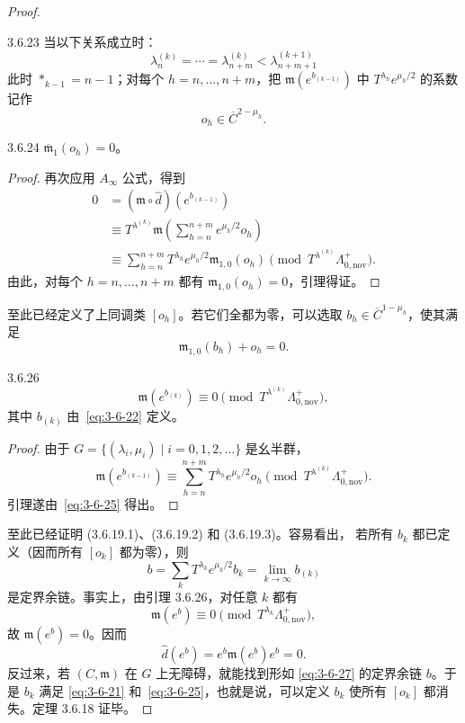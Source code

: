 \begin{proof}
\begin{definition}{3.6.23}\label{def:3-6-23}
当以下关系成立时：
\[
  \lambda_n^{(k)}=\cdots=\lambda_{n+m}^{(k)}
  <\lambda_{n+m+1}^{(k+1)}
\]
此时 $*_{k-1}=n-1$；对每个 $h=n,\ldots,n+m$，把
$\mathfrak m(e^{b_{(k-1)}})$ 中
$T^{\lambda_h}e^{\mu_h/2}$ 的系数记作
\[
  o_h\in\overline C^{2-\mu_h}.
\]
\end{definition}

\begin{lemma}{3.6.24}\label{lem:3-6-24}
$\overline{\mathfrak m}_1(o_h)=0$。
\end{lemma}

\begin{proof}
再次应用 $A_\infty$ 公式，得到
\[
\begin{aligned}
0
&=(\mathfrak m\circ\widehat d)(e^{b_{(k-1)}})\\
&\equiv
T^{\lambda^{(k)}}\mathfrak m
\left(\sum_{h=n}^{n+m}e^{\mu_h/2}o_h\right)\\
&\equiv
\sum_{h=n}^{n+m}T^{\lambda_h}e^{\mu_h/2}
\mathfrak m_{1,0}(o_h)
\pmod{T^{\lambda^{(k)}}\Lambda^+_{0,\mathrm{nov}}}.
\end{aligned}
\]
由此，对每个 $h=n,\ldots,n+m$ 都有
$\mathfrak m_{1,0}(o_h)=0$，引理得证。
\end{proof}

至此已经定义了上同调类 $[o_h]$。若它们全都为零，可以选取
$b_h\in\overline C^{1-\mu_h}$，使其满足
\begin{equation}
  \mathfrak m_{1,0}(b_h)+o_h=0.
  \tag{3.6.25}\label{eq:3-6-25}
\end{equation}

\begin{lemma}{3.6.26}\label{lem:3-6-26}
\[
  \mathfrak m(e^{b_{(k)}})
  \equiv0
  \pmod{T^{\lambda^{(k)}}\Lambda^+_{0,\mathrm{nov}}},
\]
其中 $b_{(k)}$ 由~\eqref{eq:3-6-22} 定义。
\end{lemma}

\begin{proof}
由于 $G=\{(\lambda_i,\mu_i)\mid i=0,1,2,\ldots\}$ 是幺半群，
\[
  \mathfrak m(e^{b_{(k-1)}})
  \equiv
  \sum_{h=n}^{n+m}T^{\lambda_h}e^{\mu_h/2}o_h
  \pmod{T^{\lambda^{(k)}}\Lambda^+_{0,\mathrm{nov}}}.
\]
引理遂由~\eqref{eq:3-6-25} 得出。
\end{proof}

至此已经证明 (3.6.19.1)、(3.6.19.2) 和 (3.6.19.3)。容易看出，
若所有 $b_k$ 都已定义（因而所有 $[o_k]$ 都为零），则
\begin{equation}
  b=\sum_kT^{\lambda_k}e^{\mu_k/2}b_k
  =\lim_{k\to\infty}b_{(k)}
  \tag{3.6.27}\label{eq:3-6-27}
\end{equation}
是定界余链。事实上，由引理 3.6.26，对任意 $k$ 都有
\[
  \mathfrak m(e^b)\equiv0
  \pmod{T^{\lambda_k}\Lambda^+_{0,\mathrm{nov}}},
\]
故 $\mathfrak m(e^b)=0$。因而
\[
  \widehat d(e^b)=e^b\mathfrak m(e^b)e^b=0.
\]
反过来，若 $(C,\mathfrak m)$ 在 $G$ 上无障碍，就能找到形如
\eqref{eq:3-6-27} 的定界余链 $b$。于是 $b_k$ 满足
\eqref{eq:3-6-21} 和~\eqref{eq:3-6-25}，也就是说，可以定义
$b_k$ 使所有 $[o_k]$ 都消失。定理 3.6.18 证毕。
\end{proof}

